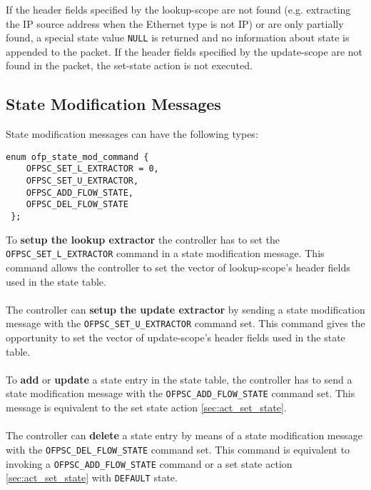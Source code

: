 If the header fields specified by the lookup-scope are not found (e.g. extracting the IP source address when the Ethernet type is not IP) or are only partially found, a special state value \texttt{NULL} is returned and no information about state is appended to the packet.
If the header fields specified by the update-scope are not found in the packet, the set-state action is not executed.

\subsection{State Modification Messages}

\label{sec:msg_set_state}

State modification messages can have the following types:
\scriptsize\begin{verbatim}
enum ofp_state_mod_command {
    OFPSC_SET_L_EXTRACTOR = 0,
    OFPSC_SET_U_EXTRACTOR,
    OFPSC_ADD_FLOW_STATE,   
    OFPSC_DEL_FLOW_STATE
 };
\end{verbatim}\normalsize



\noindent
To \textbf{setup the lookup extractor} the controller has to set the \texttt{OFPSC\_SET\_L\_EXTRACTOR} command in a state modification message. 
This command allows the controller to set the vector of lookup-scope's header fields used in the state table.
\\\\The controller can \textbf{setup the update extractor} by sending a state modification message with the \texttt{OFPSC\_SET\_U\_EXTRACTOR} command set.
This command gives the opportunity to set the vector of update-scope's header fields used in the state table.
\\\\To \textbf{add} or \textbf{update} a state entry in the state table, the controller has to send a state modification message with the \texttt{OFPSC\_ADD\_FLOW\_STATE} command set. This message is equivalent to the set state action \ref{sec:act_set_state}.
\\\\The controller can \textbf{delete} a state entry by means of a state modification message with the \texttt{OFPSC\_DEL\_FLOW\_STATE} command set. This command is equivalent to invoking a \texttt{OFPSC\_ADD\_FLOW\_STATE} command or a set state action \ref{sec:act_set_state} with \texttt{DEFAULT} state.

